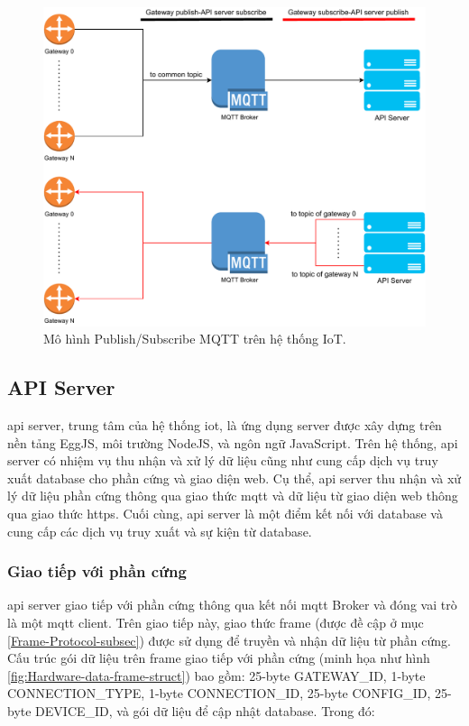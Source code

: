 \begin{figure}[htp]
\centering
\includegraphics[width=1.0\linewidth]{images/Thesis-Page-11-MQTT-Connect-Establish.pdf}
\caption{Mô hình Publish/Subscribe MQTT trên hệ thống IoT.}
\label{fig:Frame-Parsing-Process}
\end{figure}

\subsection{API Server}

\acrshort{api} server, trung tâm của hệ thống \acrshort{iot}, là ứng dụng server được xây dựng trên nền tảng EggJS, môi trường NodeJS, và ngôn ngữ JavaScript. Trên hệ thống, \acrshort{api} server có nhiệm vụ thu nhận và xử lý dữ liệu cũng như cung cấp dịch vụ truy xuất database cho phần cứng và giao diện web. Cụ thể, \acrshort{api} server thu nhận và xử lý dữ liệu phần cứng thông qua giao thức \acrshort{mqtt} và dữ liệu từ giao diện web thông qua giao thức \acrshort{https}. Cuối cùng, \acrshort{api} server là một điểm kết nối với database và cung cấp các dịch vụ truy xuất và sự kiện từ database.

\subsubsection{Giao tiếp với phần cứng}

\acrshort{api} server giao tiếp với phần cứng thông qua kết nối \acrshort{mqtt} Broker và đóng vai trò là một \acrshort{mqtt} client. Trên giao tiếp này, giao thức frame (được đề cập ở mục \ref{Frame-Protocol-subsec}) được sử dụng để truyền và nhận dữ liệu từ phần cứng.
Cấu trúc gói dữ liệu trên frame giao tiếp với phần cứng (minh họa như hình \ref{fig:Hardware-data-frame-struct}) bao gồm: 25-byte GATEWAY\_ID, 1-byte CONNECTION\_TYPE, 1-byte CONNECTION\_ID, 25-byte CONFIG\_ID, 25-byte DEVICE\_ID, và gói dữ liệu để cập nhật database. Trong đó:

